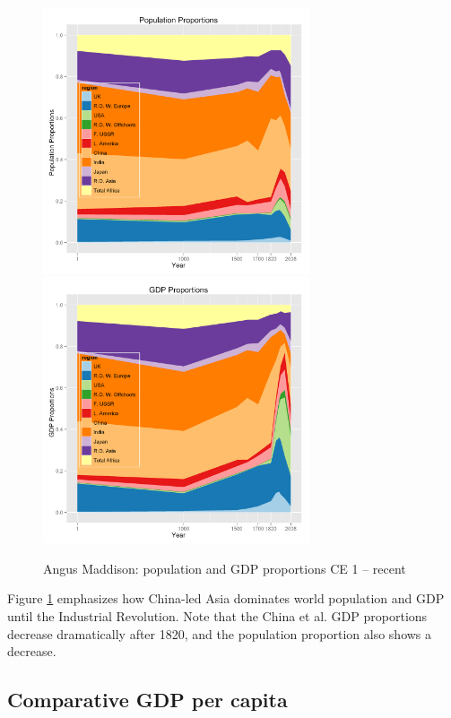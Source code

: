 \documentclass[12pt]{article}
\numberwithin{equation}{section}
\begin{document}
		\begin{figure}[h]
		\centerline{
		\mbox{\includegraphics[width=0.70\textwidth]{maddisonregpoppct.png}}
		\mbox{\includegraphics[width=0.70\textwidth]{maddisonreggdppct.png}}
		}
		\caption{Angus Maddison: population and GDP proportions CE 1 -- recent}
		\label{fig:poppct}
		\end{figure}				
				
		
		Figure \ref{fig:poppct} emphasizes how China-led Asia dominates world population and GDP until the Industrial Revolution. Note that the China et al. GDP proportions decrease dramatically after 1820, and the population proportion also shows a decrease.

		\subsection{Comparative GDP per capita}			
		
\end{document}
